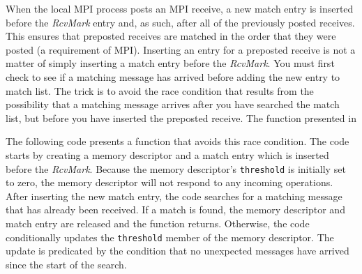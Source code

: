 \documentclass{sand-report}
\begin{document}
When the local MPI process posts an MPI receive, a new match entry is
inserted before the \emph{RcvMark} entry and, as such, after all of
the previously posted receives.  This ensures that preposted receives
are matched in the order that they were posted (a requirement of MPI).
Inserting an entry for a preposted receive is not a matter of simply
inserting a match entry before the \emph{RcvMark}.  You must first
check to see if a matching message has arrived before adding the new
entry to match list.  The trick is to avoid the race condition that
results from the possibility that a matching message arrives after you
have searched the match list, but before you have inserted the
preposted receive.  The function presented in

The following code presents a function that avoids this race
condition.  The code starts by creating a memory descriptor and a
match entry which is inserted before the \emph{RcvMark}.  Because the
memory descriptor's \texttt{threshold} is initially set to zero, the
memory descriptor will not respond to any incoming operations.  After
inserting the new match entry, the code searches for a matching
message that has already been received.  If a match is found, the
memory descriptor and match entry are released and the function
returns.  Otherwise, the code conditionally updates the
\texttt{threshold} member of the memory descriptor.  The update is
predicated by the condition that no unexpected messages have arrived
since the start of the search.
\end{document}
